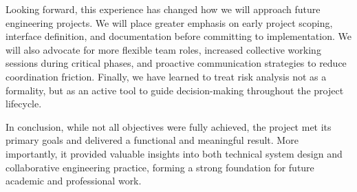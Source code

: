 \documentclass[10pt]{article}
\begin{document}
Looking forward, this experience has changed how we will approach future engineering projects. We will place greater emphasis on early project scoping, interface definition, and documentation before committing to implementation. We will also advocate for more flexible team roles, increased collective working sessions during critical phases, and proactive communication strategies to reduce coordination friction. Finally, we have learned to treat risk analysis not as a formality, but as an active tool to guide decision-making throughout the project lifecycle.

In conclusion, while not all objectives were fully achieved, the project met its primary goals and delivered a functional and meaningful result. More importantly, it provided valuable insights into both technical system design and collaborative engineering practice, forming a strong foundation for future academic and professional work.
\end{document}
